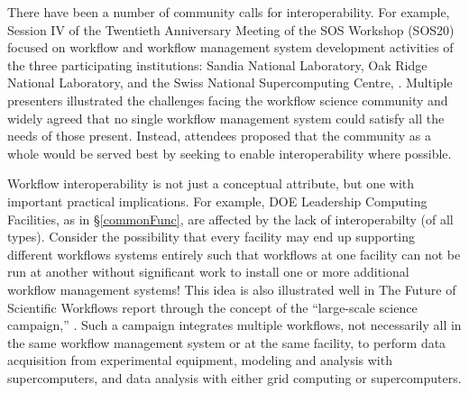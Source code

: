 There have been a number of community calls for interoperability. For example,
Session IV of the Twentieth Anniversary Meeting of the SOS Workshop (SOS20)
focused on workflow and workflow management system development activities of
the three participating institutions: Sandia National Laboratory, Oak Ridge
National Laboratory, and the Swiss National Supercomputing Centre,
\cite{pack_sos20_2016}. Multiple presenters illustrated the challenges facing
the workflow science community and widely agreed that no single workflow
management system could satisfy all the needs of those present. Instead,
attendees proposed that the community as a whole would be served best by
seeking to enable interoperability where possible.

Workflow interoperability is not just a conceptual attribute, but one with
important practical implications. For example, DOE Leadership Computing
Facilities, as in \S\ref{commonFunc}, are affected by the lack of
interoperabilty (of all types). Consider the possibility that every facility
may end up supporting different workflows systems entirely such that workflows
at one facility can not be run at another without significant work to install
one or more additional workflow management systems! This idea is also
illustrated well in The Future of Scientific Workflows report through the
concept of the ``large-scale science campaign,'' \cite{deelman_future_2015}.
Such a campaign integrates multiple workflows, not necessarily all in the same
workflow management system or at the same facility, to perform data
acquisition from experimental equipment, modeling and analysis with
supercomputers, and data analysis with either grid computing or
supercomputers.